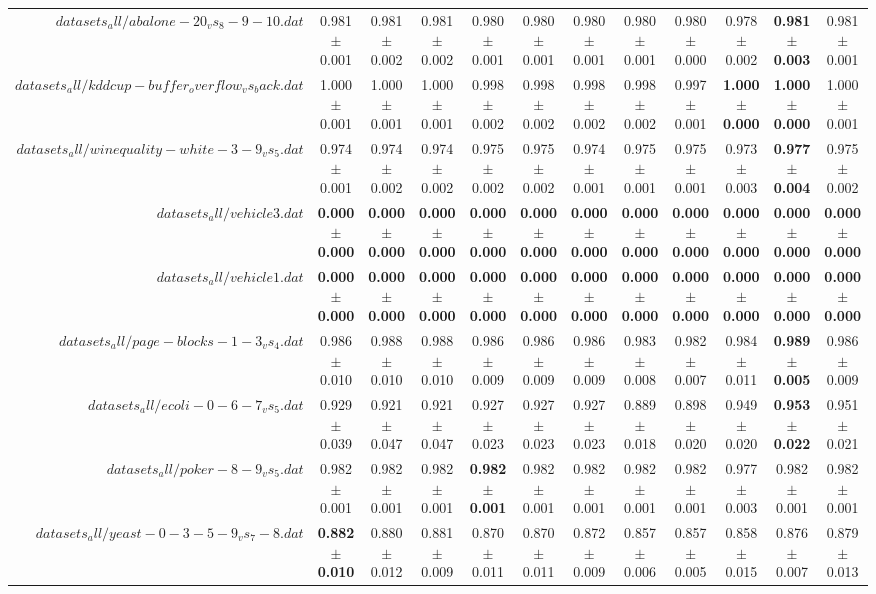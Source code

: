 \begin{table}[!ht]
{\begin{tabular}{r c c c c c c c c c c c}
$datasets_all/abalone-20_vs_8-9-10.dat$ & 0.981 $\pm$ 0.001 & 0.981 $\pm$ 0.002 & 0.981 $\pm$ 0.002 & 0.980 $\pm$ 0.001 & 0.980 $\pm$ 0.001 & 0.980 $\pm$ 0.001 & 0.980 $\pm$ 0.001 & 0.980 $\pm$ 0.000 & 0.978 $\pm$ 0.002 & \textbf{0.981 $\pm$ 0.003} & 0.981 $\pm$ 0.001 \\
$datasets_all/kddcup-buffer_overflow_vs_back.dat$ & 1.000 $\pm$ 0.001 & 1.000 $\pm$ 0.001 & 1.000 $\pm$ 0.001 & 0.998 $\pm$ 0.002 & 0.998 $\pm$ 0.002 & 0.998 $\pm$ 0.002 & 0.998 $\pm$ 0.002 & 0.997 $\pm$ 0.001 & \textbf{1.000 $\pm$ 0.000} & \textbf{1.000 $\pm$ 0.000} & 1.000 $\pm$ 0.001 \\
$datasets_all/winequality-white-3-9_vs_5.dat$ & 0.974 $\pm$ 0.001 & 0.974 $\pm$ 0.002 & 0.974 $\pm$ 0.002 & 0.975 $\pm$ 0.002 & 0.975 $\pm$ 0.002 & 0.974 $\pm$ 0.001 & 0.975 $\pm$ 0.001 & 0.975 $\pm$ 0.001 & 0.973 $\pm$ 0.003 & \textbf{0.977 $\pm$ 0.004} & 0.975 $\pm$ 0.002 \\
$datasets_all/vehicle3.dat$ & \textbf{0.000 $\pm$ 0.000} & \textbf{0.000 $\pm$ 0.000} & \textbf{0.000 $\pm$ 0.000} & \textbf{0.000 $\pm$ 0.000} & \textbf{0.000 $\pm$ 0.000} & \textbf{0.000 $\pm$ 0.000} & \textbf{0.000 $\pm$ 0.000} & \textbf{0.000 $\pm$ 0.000} & \textbf{0.000 $\pm$ 0.000} & \textbf{0.000 $\pm$ 0.000} & \textbf{0.000 $\pm$ 0.000} \\
$datasets_all/vehicle1.dat$ & \textbf{0.000 $\pm$ 0.000} & \textbf{0.000 $\pm$ 0.000} & \textbf{0.000 $\pm$ 0.000} & \textbf{0.000 $\pm$ 0.000} & \textbf{0.000 $\pm$ 0.000} & \textbf{0.000 $\pm$ 0.000} & \textbf{0.000 $\pm$ 0.000} & \textbf{0.000 $\pm$ 0.000} & \textbf{0.000 $\pm$ 0.000} & \textbf{0.000 $\pm$ 0.000} & \textbf{0.000 $\pm$ 0.000} \\
$datasets_all/page-blocks-1-3_vs_4.dat$ & 0.986 $\pm$ 0.010 & 0.988 $\pm$ 0.010 & 0.988 $\pm$ 0.010 & 0.986 $\pm$ 0.009 & 0.986 $\pm$ 0.009 & 0.986 $\pm$ 0.009 & 0.983 $\pm$ 0.008 & 0.982 $\pm$ 0.007 & 0.984 $\pm$ 0.011 & \textbf{0.989 $\pm$ 0.005} & 0.986 $\pm$ 0.009 \\
$datasets_all/ecoli-0-6-7_vs_5.dat$ & 0.929 $\pm$ 0.039 & 0.921 $\pm$ 0.047 & 0.921 $\pm$ 0.047 & 0.927 $\pm$ 0.023 & 0.927 $\pm$ 0.023 & 0.927 $\pm$ 0.023 & 0.889 $\pm$ 0.018 & 0.898 $\pm$ 0.020 & 0.949 $\pm$ 0.020 & \textbf{0.953 $\pm$ 0.022} & 0.951 $\pm$ 0.021 \\
$datasets_all/poker-8-9_vs_5.dat$ & 0.982 $\pm$ 0.001 & 0.982 $\pm$ 0.001 & 0.982 $\pm$ 0.001 & \textbf{0.982 $\pm$ 0.001} & 0.982 $\pm$ 0.001 & 0.982 $\pm$ 0.001 & 0.982 $\pm$ 0.001 & 0.982 $\pm$ 0.001 & 0.977 $\pm$ 0.003 & 0.982 $\pm$ 0.001 & 0.982 $\pm$ 0.001 \\
$datasets_all/yeast-0-3-5-9_vs_7-8.dat$ & \textbf{0.882 $\pm$ 0.010} & 0.880 $\pm$ 0.012 & 0.881 $\pm$ 0.009 & 0.870 $\pm$ 0.011 & 0.870 $\pm$ 0.011 & 0.872 $\pm$ 0.009 & 0.857 $\pm$ 0.006 & 0.857 $\pm$ 0.005 & 0.858 $\pm$ 0.015 & 0.876 $\pm$ 0.007 & 0.879 $\pm$ 0.013 \\
\end{tabular}}
\end{table}
